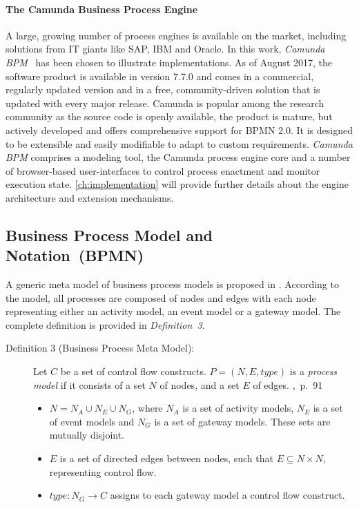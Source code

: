 \paragraph{The Camunda Business Process Engine}
A large, growing number of process engines is available on the market, including solutions from IT giants like SAP, IBM and Oracle.
In this work, \emph{Camunda BPM}~\cite{camunda} has been chosen to illustrate implementations.
As of August 2017, the software product is available in version 7.7.0 and comes in a commercial, regularly updated version and in a free, community-driven solution that is updated with every major release.
Camunda is popular among the research community as the source code is openly available, the product is mature, but actively developed and offers comprehensive support for BPMN 2.0. It is designed to be extensible and easily modifiable to adapt to custom requirements.
\emph{Camunda BPM} comprises a modeling tool, the Camunda process engine core and a number of browser-based user-interfaces to control process enactment and monitor execution state.
\autoref{ch:implementation} will provide further details about the engine architecture and extension mechanisms.


\subsection{Business Process Model and Notation~(BPMN)}

A generic meta model of business process models is proposed in \cite{weske:bpm-book}.
According to the model, all processes are composed of nodes and edges with each node representing either an activity model, an event model or a gateway model. The complete definition is provided in \textit{Definition~3}.

\begin{description}
	\item[Definition 3 (Business Process Meta Model):]
	Let $C$ be a set of control flow constructs. $P = (N,E,type)$ is a \textit{process model} if it consists of a set $N$ of nodes, and a set $E$ of edges. \cite{weske:bpm-book},~p.~91
	\begin{itemize} 
		\item
		$N = N_{A}\cup N_{E}\cup N_{G}$, where $N_{A}$ is a set of activity models, $N_{E}$ is a set of event models and $N_{G}$ is a set of gateway models. These sets are mutually disjoint.
		\item 
		$E$ is a set of directed edges between nodes, such that $E\subseteq N \times N$, representing control flow.
		\item
		$type:N_{G}\rightarrow C$ assigns to each gateway model a control flow construct.
	\end{itemize}
\end{description}

